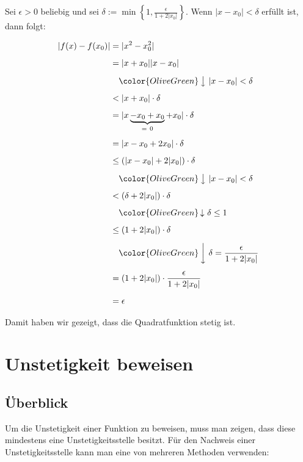 \documentclass[fontsize=9pt,
               parskip=half-,
               DIV=14,
               listof=chapterentry,
               tocflat]{scrbook}
\begin{document}
\begin{proof*}
Sei $\epsilon >0$ beliebig und sei $\delta :=\min \left\{1,{\tfrac {\epsilon }{1+2|x_{0}|}}\right\}$. Wenn $\left|x-x_{0}\right|<\delta $ erfüllt ist, dann folgt:

\begin{align*}
|f(x)-f(x_{0})|&=|x^{2}-x_{0}^{2}|\\[0.5em]&=|x+x_{0}||x-x_{0}|\\[0.5em]&\quad {\color {OliveGreen}\left\downarrow \ |x-x_{0}|<\delta \right.}\\[0.5em]&<|x+x_{0}|\cdot \delta \\[0.5em]&=|x\underbrace {-x_{0}+x_{0}} _{=\ 0}+x_{0}|\cdot \delta \\[0.5em]&=|x-x_{0}+2x_{0}|\cdot \delta \\[0.5em]&\leq (|x-x_{0}|+2|x_{0}|)\cdot \delta \\[0.5em]&\quad {\color {OliveGreen}\left\downarrow \ |x-x_{0}|<\delta \right.}\\[0.5em]&<(\delta +2|x_{0}|)\cdot \delta \\[0.5em]&\quad {\color {OliveGreen}\left\downarrow \ \delta \leq 1\right.}\\[0.5em]&\leq (1+2|x_{0}|)\cdot \delta \\[0.5em]&\quad {\color {OliveGreen}\left\downarrow \ \delta ={\frac {\epsilon }{1+2|x_{0}|}}\right.}\\[0.5em]&=(1+2|x_{0}|)\cdot {\frac {\epsilon }{1+2|x_{0}|}}\\[0.5em]&=\epsilon 
\end{align*}

Damit haben wir gezeigt, dass die Quadratfunktion stetig ist.

\end{proof*}



\chapter{Unstetigkeit beweisen}

\section{Überblick}

Um die Unstetigkeit einer Funktion zu beweisen, muss man zeigen, dass diese mindestens eine Unstetigkeitsstelle besitzt. Für den Nachweis einer Unstetigkeitsstelle kann man eine von mehreren Methoden verwenden:
\end{document}
